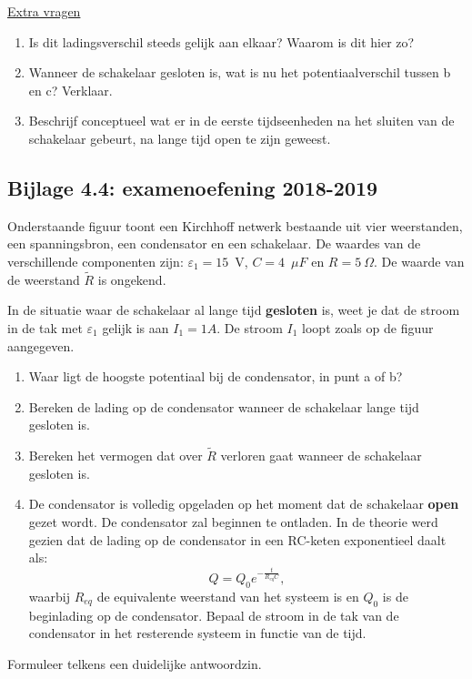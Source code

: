 \underline{Extra vragen}
\begin{enumerate}
\item Is dit ladingsverschil steeds gelijk aan elkaar? Waarom is dit hier zo?
\item Wanneer de schakelaar gesloten is, wat is nu het potentiaalverschil tussen b en c? Verklaar.
\item Beschrijf conceptueel wat er in de eerste tijdseenheden na het sluiten van de schakelaar  gebeurt, na lange tijd open te zijn geweest.
\end{enumerate}



\subsection*{Bijlage 4.4: examenoefening 2018-2019}
	
Onderstaande figuur toont een Kirchhoff netwerk bestaande uit vier weerstanden, een spanningsbron, een condensator en een schakelaar. De waardes van de verschillende componenten zijn: $\varepsilon_1=15$~V, $C=4$~$\mu F$ en $R=5~\Omega$. De waarde van de weerstand $\tilde{R}$ is ongekend. 

In de situatie waar de schakelaar al lange tijd \textbf{gesloten} is, weet je dat de stroom in de tak met $\varepsilon_1$ gelijk is aan $I_1 = 1A$. De stroom $I_1$ loopt zoals op de figuur aangegeven.

\begin{enumerate}
	\item Waar ligt de hoogste potentiaal bij de condensator, in punt a of b?
	\item Bereken de lading op de condensator wanneer de schakelaar lange tijd gesloten is.
	\item Bereken het vermogen dat over $\tilde{R}$ verloren gaat wanneer de schakelaar gesloten is.
	\item De condensator is volledig opgeladen op het moment dat de schakelaar \textbf{open} gezet wordt. De condensator zal beginnen te ontladen. In de theorie werd gezien dat de lading op de condensator in een RC-keten exponentieel daalt als: \[Q=Q_0e^{-\frac{t}{R_{eq}C}},\] waarbij $R_{eq}$ de equivalente weerstand van het systeem is en $Q_0$ is de beginlading op de condensator. Bepaal de stroom in de tak van de condensator in het resterende systeem in functie van de tijd.
\end{enumerate}
Formuleer telkens  een duidelijke antwoordzin. 

\def\x{6}
\def\y{6}
\def\dx{3}
\def\dy{3}

